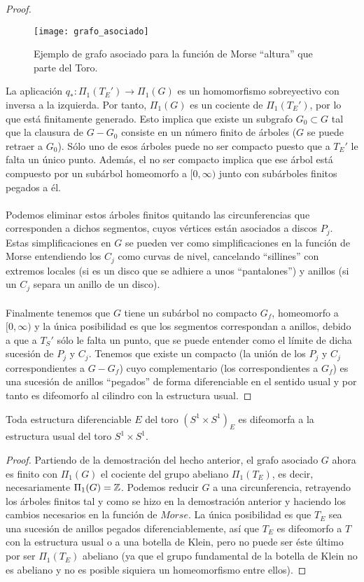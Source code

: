 \begin{proof}
\begin{figure}[h]
  	\centering
  	\texttt{[image: grafo\_asociado]}
	\caption{Ejemplo de grafo asociado para la función de Morse ``altura'' que parte del Toro.}
  	\label{fig:grafo}
\end{figure}
	\newpage
	La aplicación $q_*:\Pi_1(T_E') \rightarrow \Pi_1(G)$ es un homomorfismo sobreyectivo con inversa a la izquierda. Por tanto, $\Pi_1(G)$ es un cociente de $\Pi_1(T_E')$, por lo que está finitamente generado. Esto implica que existe un subgrafo $G_0 \subset G$ tal que la clausura de $G - G_0$ consiste en un número finito de árboles ($G$ se puede retraer a $G_0$). Sólo uno de esos árboles puede no ser compacto puesto que a $T_E'$ le falta un único punto. Además, el no ser compacto implica que ese árbol está compuesto por un subárbol homeomorfo a $[0, \infty)$ junto con subárboles finitos pegados a él.\\
	\\ Podemos eliminar estos árboles finitos quitando las circunferencias que corresponden a dichos segmentos, cuyos vértices están asociados a discos $P_j$. Estas simplificaciones en $G$ se pueden ver como simplificaciones en la función de Morse entendiendo los $C_j$ como curvas de nivel, cancelando ``sillines''  con extremos locales (si es un disco que se adhiere a unos ``pantalones'') y anillos (si un $C_j$ separa un anillo de un disco). \\
	\\ Finalmente tenemos que $G$ tiene un subárbol no compacto $G_f$, homeomorfo a $[0, \infty)$ y la única posibilidad es que los segmentos correspondan a anillos, debido a que a $T_S'$ sólo le falta un punto, que se puede entender como el límite de dicha sucesión de $P_j$ y $C_j$. Tenemos que existe un compacto (la unión de los $P_j$ y $C_j$ correspondientes a $G - G_f$) cuyo complementario (los correspondientes a $G_f$) es una sucesión de anillos ``pegados'' de forma diferenciable en el sentido usual y por tanto es difeomorfo al cilindro con la estructura usual.
\end{proof}

\begin{hecho}
	Toda estructura diferenciable $E$ del toro $(S^1 \times S^1)_E$ es difeomorfa a la estructura usual del toro $S^1 \times S^1$.
\end{hecho}

\begin{proof}
	Partiendo de la demostración del hecho anterior, el grafo asociado $G$ ahora es finito con $\Pi_1(G)$ el cociente del grupo abeliano $\Pi_1(T_E)$, es decir, necesariamente $\Pi_1(G) = \mathbb{Z}$. Podemos reducir $G$ a una circunferencia, retrayendo los árboles finitos tal y como se hizo en la demostración anterior y haciendo los cambios necesarios en la función de $Morse$. La única posibilidad es que $T_E$ sea una sucesión de anillos pegados diferenciablemente, así que $T_E$ es difeomorfo a $T$ con la estructura usual o a una botella de Klein, pero no puede ser éste último por ser $\Pi_1(T_E)$ abeliano (ya que el grupo fundamental de la botella de Klein no es abeliano y no es posible siquiera un homeomorfismo entre ellos).
\end{proof}

